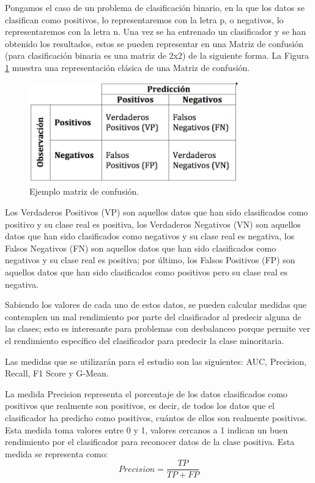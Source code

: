 Pongamos el caso de un problema de clasificación binario, en la que los datos se clasifican como positivos, lo representaremos con la letra p, o negativos, lo representaremos con la letra n. Una vez se ha entrenado un clasificador y se han obtenido los resultados, estos se pueden representar en una Matriz de confusión (para clasificación binaria es una matriz de 2x2) de la siguiente forma. La Figura \ref{fig:61} muestra una representación clásica de una Matriz de confusión.\newline

\begin{figure}[H]
	\centering
	\includegraphics[width=90mm]{imagenes/conf-matrix.png}
	\caption{Ejemplo matriz de confusión.}
	\label{fig:61}
\end{figure}

Los Verdaderos Positivos (VP) son aquellos datos que han sido clasificados como positivo y su clase real es positiva, los Verdaderos Negativos (VN) son aquellos datos que han sido clasificados como negativos y su clase real es negativa, los Falsos Negativos (FN) son aquellos datos que han sido clasificados como negativos y su clase real es positiva; por último, los Falsos Positivos (FP) son aquellos datos que han sido clasificados como positivos pero su clase real es negativa.\newline

Sabiendo los valores de cada uno de estos datos, se pueden calcular medidas que contemplen un mal rendimiento por parte del clasificador al predecir alguna de las clases; esto es interesante para problemas con desbalanceo porque permite ver el rendimiento específico del clasificador para predecir la clase minoritaria.\newline

Las medidas que se utilizarán para el estudio son las siguientes: AUC, Precision, Recall, F1 Score y G-Mean.\newline

La medida Precision representa el porcentaje de los datos clasificados como positivos que realmente son positivos, es decir, de todos los datos que el clasificador ha predicho como positivos, cuántos de ellos son realmente positivos. Esta medida toma valores entre 0 y 1, valores cercanos a 1 indican un buen rendimiento por el clasificador para reconocer datos de la clase positiva. Esta medida se representa como:\newline
$$ Precision = \frac{TP}{TP + FP} $$


